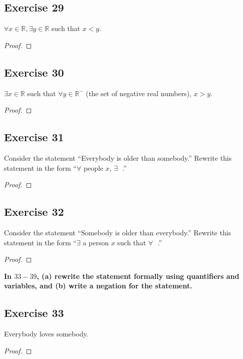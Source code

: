 \documentclass[14pt]{extarticle}
\newcommand{\fbl}{\underline{\hspace{1cm}}\,\,}
\newcommand{\R}{\mathbb{R}}
\newcommand{\fa}{\forall}
\newcommand{\te}{\exists}
\begin{document}
\subsection{Exercise 29}
$\fa x \in \R, \te y \in \R$ such that $x < y$.

\begin{proof}

\end{proof}

\subsection{Exercise 30}
$\te x \in \R$ such that $\fa y \in \R^-$ (the set of negative real numbers), $x > y$.

\begin{proof}

\end{proof}

\subsection{Exercise 31}
Consider the statement “Everybody is older than somebody.” Rewrite this statement in the form “$\fa$ people $x$, $\te$ \fbl.”

\begin{proof}

\end{proof}

\subsection{Exercise 32}
Consider the statement “Somebody is older than everybody.” Rewrite this statement in the form “$\te$ a person $x$ such that $\fa$ \fbl.”

\begin{proof}

\end{proof}

{\bf \color{cyan} In $33-39$, (a) rewrite the statement formally using quantifiers and variables, and (b) write a negation for the statement.}

\subsection{Exercise 33}
Everybody loves somebody.

\begin{proof}

\end{proof}
\end{document}
